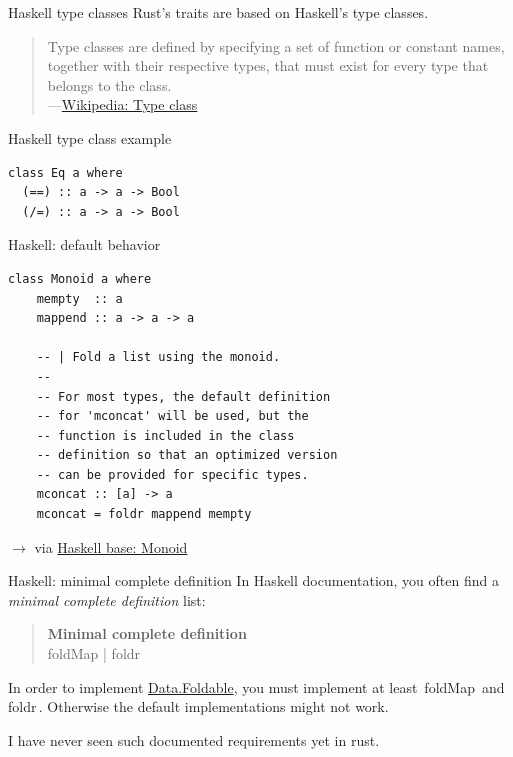 \documentclass{beamer}
\newcommand\code[1]{\,{\color[HTML]{884400}#1}\,}
\newcommand\source[1]{$\rightarrow$ via #1}
\begin{document}
\begin{frame}[fragile]{Haskell type classes}
  Rust's traits are based on Haskell's type classes.

  \begin{quote}
    Type classes are defined by specifying a set of function or constant names, together with their respective types, that must exist for every type that belongs to the class. \\
    ---\href{https://en.wikipedia.org/wiki/Type_class}{Wikipedia: Type class}
  \end{quote}
\end{frame}

\begin{frame}[fragile]{Haskell type class example}
  \begin{verbatim}
class Eq a where
  (==) :: a -> a -> Bool
  (/=) :: a -> a -> Bool
  \end{verbatim}
\end{frame}

\begin{frame}[fragile]{Haskell: default behavior}
  \begin{verbatim}
class Monoid a where
    mempty  :: a
    mappend :: a -> a -> a

    -- | Fold a list using the monoid.
    --
    -- For most types, the default definition
    -- for 'mconcat' will be used, but the
    -- function is included in the class
    -- definition so that an optimized version
    -- can be provided for specific types.
    mconcat :: [a] -> a
    mconcat = foldr mappend mempty
  \end{verbatim}
  \source{\href{https://hackage.haskell.org/package/base-4.12.0.0/docs/src/GHC.Base.html\#Monoid}{Haskell base: Monoid}}
\end{frame}

\begin{frame}[fragile]{Haskell: minimal complete definition}
  In Haskell documentation, you often find a \emph{minimal complete definition} list:

  \vspace{20pt}
  \begin{quote}
    \textbf{Minimal complete definition} \\
    foldMap | foldr
  \end{quote}

  In order to implement \href{https://hackage.haskell.org/package/base-4.12.0.0/docs/Data-Foldable.html}{Data.Foldable}, you must implement at least \code{foldMap} and \code{foldr}. Otherwise the default implementations might not work.

  I have never seen such documented requirements yet in rust.
\end{frame}
\end{document}
